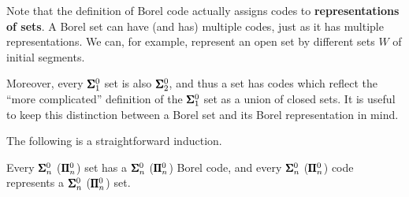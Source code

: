 Note that the definition of Borel code actually assigns codes to \textbf{representations of sets}. A Borel set can have (and has) multiple codes, just as it has multiple representations. We can, for example, represent an open set by different sets $W$ of initial segments.

Moreover, every $\pmb{\Sigma}^0_1$ set is also $\pmb{\Sigma}^0_2$, and thus a set has codes which reflect the ``more complicated'' definition of the $\pmb{\Sigma}^0_1$ set as a union of closed sets. It is useful to keep this distinction between a Borel set and its Borel representation in mind.

The following is a straightforward induction.

\begin{proposition}\label{prop-borel-codes}Every $\pmb{\Sigma}^0_n$ ($\pmb{\Pi}^0_n$) set has a $\pmb{\Sigma}^0_n$ ($\pmb{\Pi}^0_n$) Borel code, and every $\pmb{\Sigma}^0_n$ ($\pmb{\Pi}^0_n$) code represents a $\pmb{\Sigma}^0_n$ ($\pmb{\Pi}^0_n$) set.

\end{proposition}

% 
% 
% 
% 
% 
%

